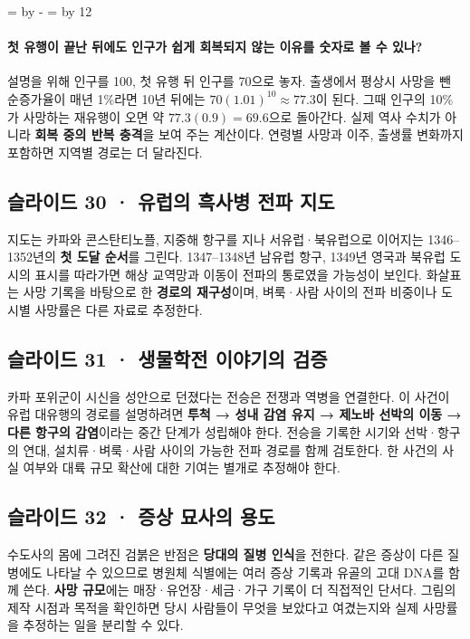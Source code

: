\documentclass[10pt,a4paper]{article}
\newcommand{\ReserveQuestionSpace}{%
  \par\begingroup
  \dimen0=\pagegoal \advance\dimen0 by -\pagetotal
  \dimen2=\baselineskip \multiply\dimen2 by 12
  \ifdim\dimen0<\dimen2 \newpage\fi
  \endgroup}
\begin{document}
\ReserveQuestionSpace
\paragraph{첫 유행이 끝난 뒤에도 인구가 쉽게 회복되지 않는 이유를 숫자로 볼 수 있나?}
설명을 위해 인구를 100, 첫 유행 뒤 인구를 70으로 놓자. 출생에서 평상시 사망을 뺀 순증가율이 매년 1\%라면 10년 뒤에는 $70(1.01)^{10}\approx77.3$이 된다. 그때 인구의 10\%가 사망하는 재유행이 오면 약 $77.3(0.9)=69.6$으로 돌아간다. 실제 역사 수치가 아니라 \textbf{회복 중의 반복 충격}을 보여 주는 계산이다. 연령별 사망과 이주, 출생률 변화까지 포함하면 지역별 경로는 더 달라진다.\par

\subsection{슬라이드 30 · 유럽의 흑사병 전파 지도}
지도는 카파와 콘스탄티노플, 지중해 항구를 지나 서유럽·북유럽으로 이어지는 1346–1352년의 \textbf{첫 도달 순서}를 그린다. 1347–1348년 남유럽 항구, 1349년 영국과 북유럽 도시의 표시를 따라가면 해상 교역망과 이동이 전파의 통로였을 가능성이 보인다. 화살표는 사망 기록을 바탕으로 한 \textbf{경로의 재구성}이며, 벼룩·사람 사이의 전파 비중이나 도시별 사망률은 다른 자료로 추정한다.\par

\subsection{슬라이드 31 · 생물학전 이야기의 검증}
카파 포위군이 시신을 성안으로 던졌다는 전승은 전쟁과 역병을 연결한다. 이 사건이 유럽 대유행의 경로를 설명하려면 \textbf{투척 → 성내 감염 유지 → 제노바 선박의 이동 → 다른 항구의 감염}이라는 중간 단계가 성립해야 한다. 전승을 기록한 시기와 선박·항구의 연대, 설치류·벼룩·사람 사이의 가능한 전파 경로를 함께 검토한다. 한 사건의 사실 여부와 대륙 규모 확산에 대한 기여는 별개로 추정해야 한다.\par

\subsection{슬라이드 32 · 증상 묘사의 용도}
수도사의 몸에 그려진 검붉은 반점은 \textbf{당대의 질병 인식}을 전한다. 같은 증상이 다른 질병에도 나타날 수 있으므로 병원체 식별에는 여러 증상 기록과 유골의 고대 DNA를 함께 쓴다. \textbf{사망 규모}에는 매장·유언장·세금·가구 기록이 더 직접적인 단서다. 그림의 제작 시점과 목적을 확인하면 당시 사람들이 무엇을 보았다고 여겼는지와 실제 사망률을 추정하는 일을 분리할 수 있다.\par
\end{document}
